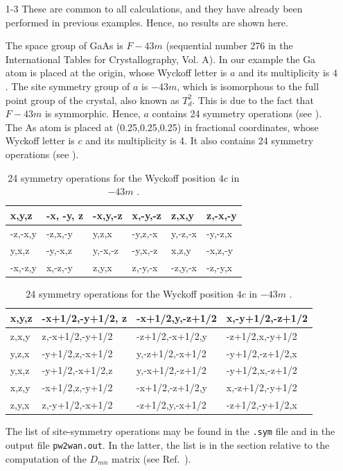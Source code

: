 \begin{itemize}
	\item [1-3] These are common to all calculations, and they have already been performed in previous examples. Hence, no results are shown here.  

The space group of GaAs is $F{-}43m$ (sequential  number 276 in the International Tables for Crystallography, Vol. A).
In our example the Ga atom is placed at the origin, whose Wyckoff letter is $a$ and its multiplicity is $4$. The site symmetry group of $a$ is ${-}43m$, which is isomorphous to the full point group of the crystal, also known as $T_d^2$. This is due to the fact that $F{-}43m$ is symmorphic. Hence, $a$ contains 24 symmetry operations (see ). The As atom is placed at (0.25,0.25,0.25) in fractional coordinates, whose Wyckoff letter is $c$ and its multiplicity is 4. It also contains 24 symmetry operations (see ). 
\begin{table}[b!]
	\centering
	\captionsetup{width=.5\textwidth}
	\caption{24 symmetry operations for the Wyckoff position $4a$ in $-43m$ \cite{bilbaocrystserver}.}
	\begin{tabular}{@{} |l|l|l|l|l|l| @{}}\toprule[1.5pt]
	x,y,z & -x, -y, z & -x,y,-z & x,-y,-z & z,x,y & z,-x,-y \\
	\hline
	-z,-x,y & -z,x,-y & y,z,x & -y,z,-x & y,-z,-x & -y,-z,x \\
	\hline
	y,x,z & -y,-x,z & y,-x,-z & -y,x,-z & x,z,y & -x,z,-y \\
	\hline
	-x,-z,y & x,-z,-y & z,y,x & z,-y,-x & -z,y,-x & -z,-y,x \\
	\bottomrule[1pt]
	\end{tabular}\label{tab21.1}

	\centering
	\captionsetup{width=.5\textwidth}
	\caption{24 symmetry operations for the Wyckoff position $4c$ in $-43m$ \cite{bilbaocrystserver}.}
	\begin{tabular}{@{} |l|l|l|l| @{}}\toprule[1.5pt]
	x,y,z & -x+1/2,-y+1/2, z & -x+1/2,y,-z+1/2 & x,-y+1/2,-z+1/2  \\ 
	\hline
	z,x,y & z,-x+1/2,-y+1/2 & -z+1/2,-x+1/2,y & -z+1/2,x,-y+1/2  \\
	\hline
	y,z,x & -y+1/2,z,-x+1/2 & y,-z+1/2,-x+1/2 & -y+1/2,-z+1/2,x  \\ 
	\hline
	y,x,z & -y+1/2,-x+1/2,z & y,-x+1/2,-z+1/2 & -y+1/2,x,-z+1/2 \\ 
	\hline 
	x,z,y & -x+1/2,z,-y+1/2 & -x+1/2,-z+1/2,y & x,-z+1/2,-y+1/2 \\
	\hline
	z,y,x & z,-y+1/2,-x+1/2 & -z+1/2,y,-x+1/2 & -z+1/2,-y+1/2,x \\
	\bottomrule[1pt]
	\end{tabular}\label{tab21.2}
\end{table}
The list of site-symmetry operations may be found in the {\tt .sym} file and in the output file {\tt pw2wan.out}. In the latter, the list is in the section relative to the computation of the $D_{mn}$ matrix (see Ref.~).
\end{itemize}
\clearpage


